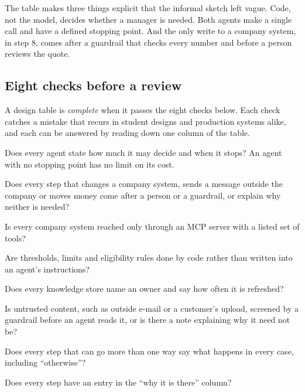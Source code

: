 The table makes three things explicit that the informal sketch left vague. Code, not the model, decides whether a manager is needed. Both agents make a single call and have a defined stopping point. And the only write to a company system, in step 8, comes after a guardrail that checks every number and before a person reviews the quote.

\subsection{Eight checks before a review}
\label{sec:checks}

A design table is \emph{complete} when it passes the eight checks below. Each check catches a mistake that recurs in student designs and production systems alike, and each can be answered by reading down one column of the table.

\begin{tryit}
\begin{description}[leftmargin=1em,itemsep=2pt]
  \item[$\square$ Bounded agents.] Does every agent state how much it may decide and when it stops? An agent with no stopping point has no limit on its cost.
  \item[$\square$ Protected writes.] Does every step that changes a company system, sends a message outside the company or moves money come after a person or a guardrail, or explain why neither is needed?
  \item[$\square$ Servers in front of systems.] Is every company system reached only through an MCP server with a listed set of tools?
  \item[$\square$ Rules in code.] Are thresholds, limits and eligibility rules done by code rather than written into an agent's instructions?
  \item[$\square$ Owned knowledge.] Does every knowledge store name an owner and say how often it is refreshed?
  \item[$\square$ Screened input.] Is untrusted content, such as outside e-mail or a customer's upload, screened by a guardrail before an agent reads it, or is there a note explaining why it need not be?
  \item[$\square$ Complete branches.] Does every step that can go more than one way say what happens in every case, including ``otherwise''?
  \item[$\square$ Justified steps.] Does every step have an entry in the ``why it is there'' column?
\end{description}
\end{tryit}

